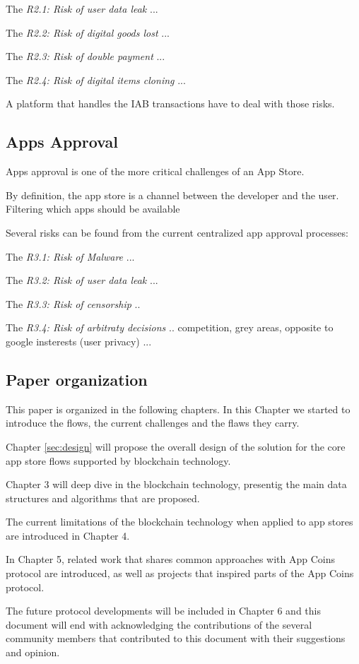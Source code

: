 The {\em R2.1: Risk of user data leak} ...

The {\em R2.2: Risk of digital goods lost} ...

The {\em R2.3: Risk of double payment} ...

The {\em R2.4: Risk of digital items cloning} ...

A platform that handles the IAB transactions have to deal with those risks.


\subsection{Apps Approval}


Apps approval is one of the more critical challenges of an App Store.

By definition, the app store is a channel between the developer and the user. Filtering which apps should be available 


Several risks can be found from the current centralized app approval processes:

The {\em R3.1: Risk of Malware} ...

The {\em R3.2: Risk of user data leak} ...

The {\em R3.3: Risk of censorship} ..

The {\em R3.4: Risk of arbitraty decisions} .. competition, grey areas, opposite to google insterests (user privacy) ...



\subsection{Paper organization}

This paper is organized in the following chapters. In this Chapter we started to introduce the flows, the current challenges and the flaws they carry.

Chapter \ref{sec:design} will propose the overall design of the solution for the core app store flows supported by blockchain technology. 

Chapter 3 will deep dive in the blockchain technology, presentig the main data structures and algorithms that are proposed.

The current limitations of the blockchain technology when applied to app stores are introduced in Chapter 4.

In Chapter 5, related work that shares common approaches with App Coins protocol are introduced, as well as projects that inspired parts of the App Coins protocol.

The future protocol developments will be included in Chapter 6 and this document will end with acknowledging the contributions of the several community members that contributed to this document with their suggestions and opinion.




